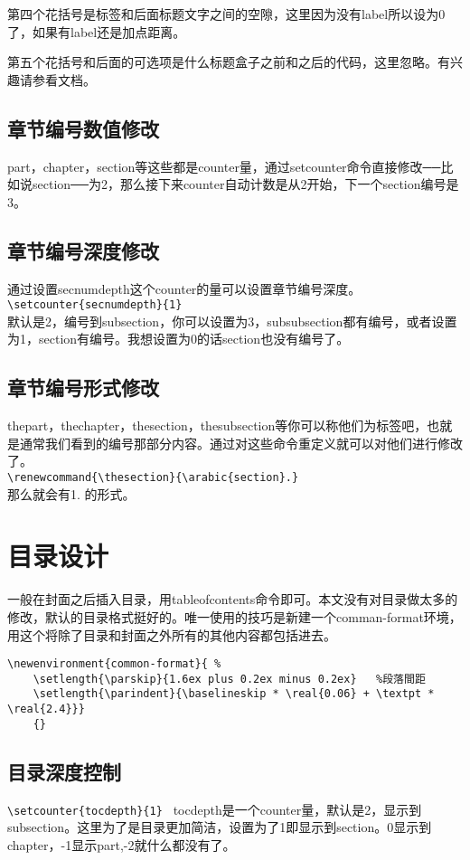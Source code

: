 第四个花括号是标签和后面标题文字之间的空隙，这里因为没有label所以设为0了，如果有label还是加点距离。

第五个花括号和后面的可选项是什么标题盒子之前和之后的代码，这里忽略。有兴趣请参看文档。


\subsection{章节编号数值修改}
part，chapter，section等这些都是counter量，通过setcounter命令直接修改──比如说section──为2，那么接下来counter自动计数是从2开始，下一个section编号是3。

\subsection{章节编号深度修改}
通过设置secnumdepth这个counter的量可以设置章节编号深度。\\
\verb+\setcounter{secnumdepth}{1} +\\
默认是2，编号到subsection，你可以设置为3，subsubsection都有编号，或者设置为1，section有编号。我想设置为0的话section也没有编号了。

\subsection{章节编号形式修改}
thepart，thechapter，thesection，thesubsection等你可以称他们为标签吧，也就是通常我们看到的编号那部分内容。通过对这些命令重定义就可以对他们进行修改了。\\
\verb+\renewcommand{\thesection}{\arabic{section}.}+\\
那么就会有1. 的形式。


\section{目录设计}
一般在封面之后插入目录，用tableofcontents命令即可。本文没有对目录做太多的修改，默认的目录格式挺好的。唯一使用的技巧是新建一个comman-format环境，用这个将除了目录和封面之外所有的其他内容都包括进去。
\begin{verbatim}
\newenvironment{common-format}{ %
	\setlength{\parskip}{1.6ex plus 0.2ex minus 0.2ex}   %段落間距
	\setlength{\parindent}{\baselineskip * \real{0.06} + \textpt * \real{2.4}}}  
    {}
\end{verbatim}

\subsection{目录深度控制}
\verb+\setcounter{tocdepth}{1} +
tocdepth是一个counter量，默认是2，显示到subsection。这里为了是目录更加简洁，设置为了1即显示到section。0显示到chapter，-1显示part,-2就什么都没有了。

